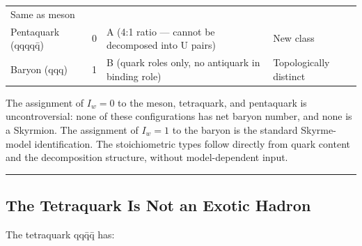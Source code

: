 \begin{longtable}[]{@{}llll@{}}
\begin{minipage}[t]{0.22\columnwidth}
Same as meson\strut
\end{minipage}\tabularnewline
\begin{minipage}[t]{0.22\columnwidth}\raggedright
Pentaquark (qqqqq̄)\strut
\end{minipage} & \begin{minipage}[t]{0.22\columnwidth}\raggedright
0\strut
\end{minipage} & \begin{minipage}[t]{0.22\columnwidth}\raggedright
A (4:1 ratio --- cannot be decomposed into U pairs)\strut
\end{minipage} & \begin{minipage}[t]{0.22\columnwidth}\raggedright
New class\strut
\end{minipage}\tabularnewline
\begin{minipage}[t]{0.22\columnwidth}\raggedright
Baryon (qqq)\strut
\end{minipage} & \begin{minipage}[t]{0.22\columnwidth}\raggedright
1\strut
\end{minipage} & \begin{minipage}[t]{0.22\columnwidth}\raggedright
B (quark roles only, no antiquark in binding role)\strut
\end{minipage} & \begin{minipage}[t]{0.22\columnwidth}\raggedright
Topologically distinct\strut
\end{minipage}\tabularnewline
\bottomrule
\end{longtable}

The assignment of \(I_w = 0\) to the meson, tetraquark, and pentaquark
is uncontroversial: none of these configurations has net baryon number,
and none is a Skyrmion. The assignment of \(I_w = 1\) to the baryon is
the standard Skyrme- model identification. The stoichiometric types
follow directly from quark content and the decomposition structure,
without model-dependent input.

\begin{center}\rule{0.5\linewidth}{0.5pt}\end{center}

\hypertarget{the-tetraquark-is-not-an-exotic-hadron}{%
\subsection{The Tetraquark Is Not an Exotic
Hadron}\label{the-tetraquark-is-not-an-exotic-hadron}}

The tetraquark qqq̄q̄ has:


